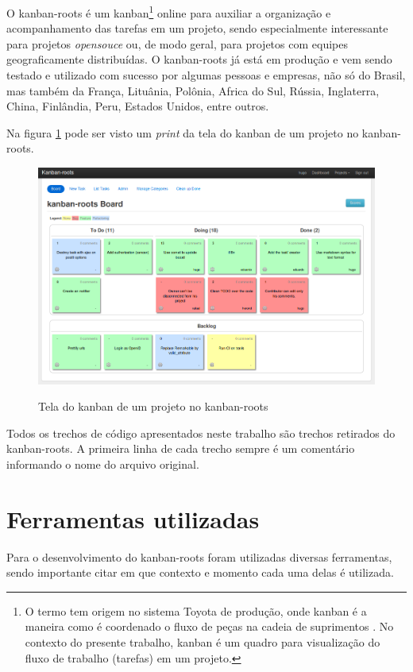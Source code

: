 O kanban-roots é um kanban\footnote{O termo tem origem no sistema Toyota de produção, onde kanban é a maneira como é coordenado o fluxo de peças na cadeia de suprimentos  \cite{AMaquinaQueMudouOMundo}. No contexto do presente trabalho, kanban é um quadro para visualização do fluxo de trabalho (tarefas) em um projeto.} online para auxiliar a organização e acompanhamento das tarefas em um projeto, sendo especialmente interessante para projetos \textit{opensouce} ou, de modo geral, para projetos com equipes geograficamente distribuídas.  O kanban-roots já está em produção e vem sendo testado e utilizado com sucesso por algumas pessoas e empresas, não só do Brasil, mas também da França, Lituânia, Polônia, Africa do Sul, Rússia, Inglaterra, China, Finlândia, Peru, Estados Unidos, entre outros.

Na figura \ref{img:tela_kaban_roots} pode ser visto um \textit{print} da tela do kanban de um projeto no kanban-roots.

\begin{figure}[h]
  \center
  \caption{Tela do kanban de um projeto no kanban-roots}
  \includegraphics[scale=0.45]{images/kanban-roots}
  \label{img:tela_kaban_roots}
\end{figure}

Todos os trechos de código apresentados neste trabalho são trechos retirados do kanban-roots. A primeira linha de cada trecho sempre é um comentário informando o nome do arquivo original.

\section{Ferramentas utilizadas}

Para o desenvolvimento do kanban-roots foram utilizadas diversas ferramentas, sendo importante citar em que contexto e momento cada uma delas é utilizada.

